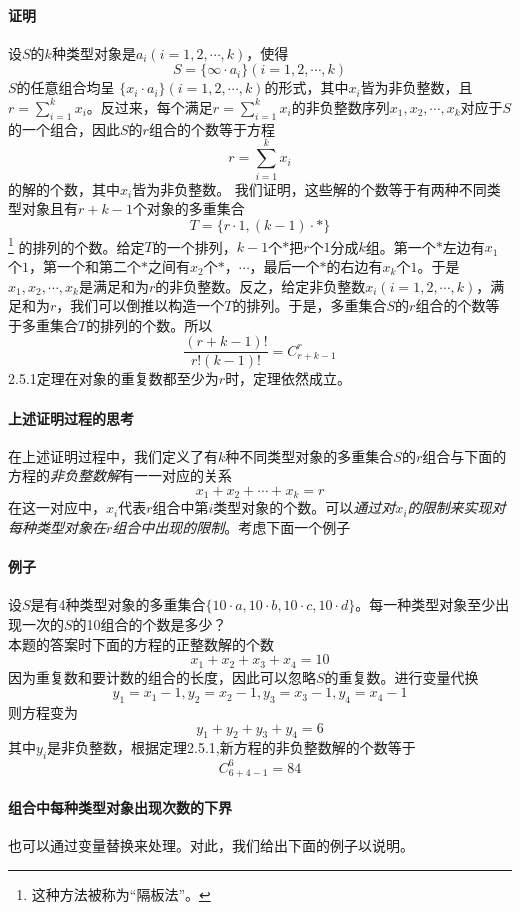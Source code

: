 \documentclass{ctexart}
\begin{document}
   \paragraph{证明}
   设$S$的$k$种类型对象是$a_i(i = 1,2,\cdots,k)$，使得
   \[S = \{\infty \cdot a_i \}(i = 1,2,\cdots,k)\]
   $S$的任意组合均呈 $\{x_i \cdot a_i\}(i = 1,2,\cdots,k)$的形式，其中$x_i$皆为非负整数，且$r = \sum_{i = 1}^k x_i$。反过来，每个满足$r = \sum_{i = 1}^k x_i$的非负整数序列$x_1 , x_2 ,\cdots,x_k$对应于$S$的一个组合，因此$S$的$r$组合的个数等于方程
   \[r = \sum_{i = 1}^k x_i\]
   的解的个数，其中$x_i$皆为非负整数。
   我们证明，这些解的个数等于有两种不同类型对象且有$r + k -1$个对象的多重集合
   \[T = \{r \cdot 1 , (k-1) \cdot *\}\]
   \footnote{这种方法被称为“隔板法”。}
   的排列的个数。给定$T$的一个排列，$k-1$个$*$把$r$个$1$分成$k$组。第一个$*$左边有$x_1$个$1$，第一个和第二个$*$之间有$x_2$个$*$，$\cdots$，最后一个$*$的右边有$x_k$个$1$。于是$x_1 ,x_2 ,\cdots ,x_k$是满足和为$r$的非负整数。反之，给定非负整数$x_i(i = 1,2,\cdots,k)$，满足和为$r$，我们可以倒推以构造一个$T$的排列。于是，多重集合$S$的$r$组合的个数等于多重集合$T$的排列的个数。所以
   \[\frac{(r+k-1)!}{r!(k-1)!} = C_{r+k-1}^r\]
   2.5.1定理在对象的重复数都至少为$r$时，定理依然成立。
   \paragraph{上述证明过程的思考}
   在上述证明过程中，我们定义了有$k$种不同类型对象的多重集合$S$的$r$组合与下面的方程的\textit{非负整数解}有一一对应的关系
   \[x_1 + x_2 + \cdots + x_k = r\]
   在这一对应中，$x_i$代表$r$组合中第$i$类型对象的个数。可以\textit{通过对$x_i$的限制来实现对每种类型对象在$r$组合中出现的限制}。考虑下面一个例子
   \paragraph{例子}设$S$是有4种类型对象的多重集合$\{10 \cdot a , 10 \cdot b , 10 \cdot c ,10 \cdot d\}$。每一种类型对象至少出现一次的$S$的10组合的个数是多少？\\
   本题的答案时下面的方程的正整数解的个数
   \[x_1 + x_2 + x_3 + x_4 = 10\]
     因为重复数和要计数的组合的长度，因此可以忽略$S$的重复数。进行变量代换
     \[y_1 = x_1 -1 , y_2 = x_2 - 1 , y_3 = x_3 - 1 , y_4 = x_4 -1\]
     则方程变为
     \[y_1 + y_2 + y_3 + y_4 = 6\]
     其中$y_i$是非负整数，根据定理2.5.1,新方程的非负整数解的个数等于
     \[C_{6+4-1}^6 = 84\]
     \paragraph{组合中每种类型对象出现次数的下界}也可以通过变量替换来处理。对此，我们给出下面的例子以说明。
\end{document}
